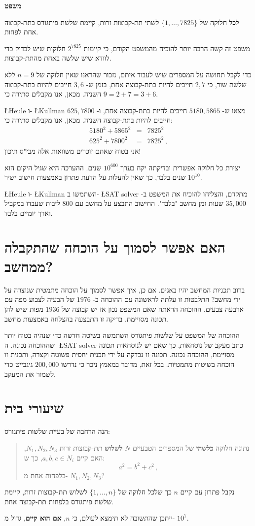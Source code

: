 \documentclass[12pt,a4paper]{article}
\begin{document}
\textbf{משפט}

\textbf{לכל}
חלוקה של 
$\{1,\ldots,7825\}$
לשתי תת-קבוצות זרות, קיימת שלשת פיתגורס בתת-קבוצה אחת לפחות.

משפט זה קשה הרבה יותר להוכיח מהמשפט הקודם, כי קיימות 
$2^{7825}$
חלוקות שיש לבדוק כדי לוודא שיש שלשה באחת מהתת-קבוצות.

כדי לקבל תחושה על המספרים שיש לעבוד איתם, נזכור שהראנו שאין חלוקה של
$n=9$
ללא שלשת שור, כי
$2,7$
חייבים להיות בתת-קבוצה אחת, בזמן ש-%
$3,6$
חייבים להיות בתת-קבוצה השניה. מכאן, אנו מקבלים סתירה כי
$9=2+7=3+6$.

\L{Heule}
ו-%
\L{Kullman}
מצאו ש-%
$5180,5865$
חייבים להיות בתת-קבוצה אחת, ו-%
$625,7800$
חייבים להיות בתת-קבוצה השניה. מכאן, אנו מקבלים סתירה כי:
\begin{eqnarray*}
5180^2 + 5865^2 &=& 7825^2\\
625^2 + 7800^2 &=& 7825^2\,,
\end{eqnarray*}
אני בטוח שאתם זוכרים משוואות אלה מבי"ס תיכון!

יצירת כל חלוקה אפשרית ובדיקתה יקח בערך
$10^{600}$
שנים. ההערכה היא שגיל היקום הוא 
$10^{10}$
שנים בלבד, כך שאין להעלות על הדעת פתרון באמצעות חישוב ישיר.

\L{Heule}
ו-%
\L{Kullman}
השתמשו ב-%
\L{SAT solver}
מתקדם, והצליחו להוכיח את המשפט ב-%
$35,000$
שעות זמן מחשב "בלבד". החישוב התבצע על מחשב עם 
$800$
ליבות שעבדו במקביל וארך יומיים בלבד.

\section{האם אפשר לסמוך על הוכחה שהתקבלה ממחשב?}

ברוב תכניות המחשב יהיו באגים. אם כן, איך אפשר לסמוך על הוכחה מתמטית שנוצרה על ידי מחשב? התלבטות זו עלתה לראשונה עם ההוכחה ב-%
$1976$
של הבעיה לצבוע מפה עם ארבעה צבעים. ההוכחה הראתה שאם המשפט נכון אז יש קבוצה של 
$1936$
מפות שיש להן תכונה מסויימת. בדיקה זו התבצעה בהצלחה באמצעות מחשב.

ההוכחה של המשפט על שלשות פיתגורס השתמשה בשיטה חדשה כדי שנהיה בטוח יותר שההוכחה נכונה. ה-%
\L{SAT solver}
כתב מעקב של נוסחאות, כך שאם יש לנוסחאות תכונה מסויימת, ההוכחה נכונה. תכונה זו נבדקה על ידי תכנית יחסית פשוטה וקצרה, ותכנית זו הוכחה בשיטות מתמטיות. בכל זאת, מדובר במאמץ ניכר כי נדרשו 
$200,000$
גיגבייט כדי לשמור את המעקב.

\section{שיעורי בית}

הנה הרחבה של בעיית שלשות פיתגורס:
\begin{quote}
נתונה חלוקה
\textbf{כלשהי}
של המספרים הטבעיים 
$N$
\textbf{לשלוש}
תת-קבוצות זרות
$N_1,N_2,N_3$,
האם קיים
$a,b,c\in N_i$,
כך ש:
\[
a^2=b^2+c^2\,,
\]
בלפחות אחת מ-%
$N_1,N_2,N_3$?
\end{quote}
נקבל פתרון עם קיים 
$n$
כך שלכל חלוקה של 
$\{1,\ldots,n\}$
לשלוש תת-קבוצות זרות, קיימת שלשת פיתגורס בלפחות תת-קבוצה אחת.

ייתכן שהתשובה לא תימצא לעולם, כי
$n$,
\textbf{אם הוא קיים},
גדול מ-%
$10^7$.
\end{document}
